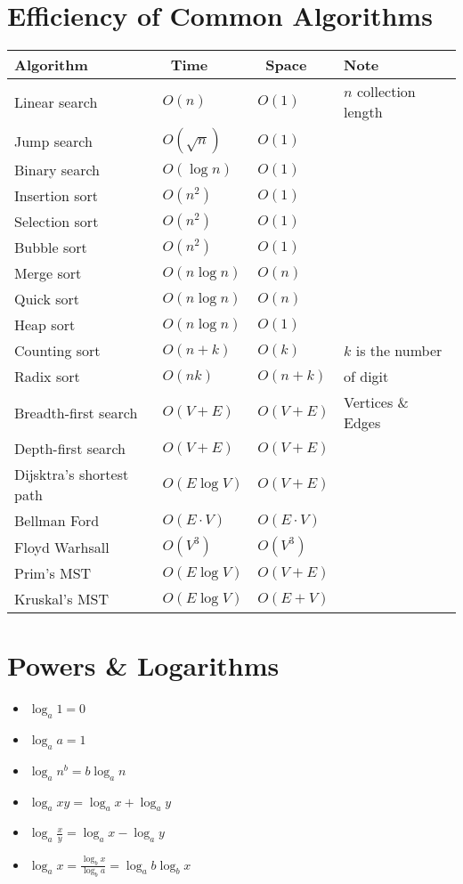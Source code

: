 \documentclass[11pt]{article}
\begin{document}
\section{Efficiency of Common Algorithms}
\label{sec:org502e29c}


\begin{center}
\begin{tabular}{llll}
Algorithm &  Time &  Space & Note\\
\hline
Linear search & \(O(n)\) & \(O(1)\) & \(n\) collection length\\
Jump search & \(O(\sqrt{n})\) & \(O(1)\) & \\
Binary search & \(O(\log n)\) & \(O(1)\) & \\
\hline
Insertion sort & \(O(n^2)\) & \(O(1)\) & \\
Selection sort & \(O(n^2)\) & \(O(1)\) & \\
Bubble sort & \(O(n^2)\) & \(O(1)\) & \\
Merge sort & \(O(n \log n)\) & \(O(n)\) & \\
Quick sort & \(O(n \log n)\) & \(O(n)\) & \\
Heap sort & \(O(n \log n)\) & \(O(1)\) & \\
\hline
Counting sort & \(O(n+k)\) & \(O(k)\) & \(k\) is the number\\
Radix sort & \(O(nk)\) & \(O(n+k)\) & of digit\\
\hline
Breadth-first search & \(O(V+E)\) & \(O(V+E)\) & Vertices \& Edges\\
Depth-first search & \(O(V+E)\) & \(O(V+E)\) & \\
Dijsktra's shortest path & \(O(E \log V)\) & \(O(V+E)\) & \\
Bellman Ford & \(O(E \cdot V)\) & \(O(E \cdot V)\) & \\
Floyd Warhsall & \(O(V^3)\) & \(O(V^3)\) & \\
Prim's MST & \(O(E \log V)\) & \(O(V+E)\) & \\
Kruskal's MST & \(O(E \log V)\) & \(O(E+V)\) & \\
\hline
\end{tabular}
\end{center}

\section{Powers \& Logarithms}
\label{sec:org99b4f5f}

\begin{itemize}
\item \(\log_a 1 = 0\)

\item \(\log_a a = 1\)

\item \(\log_a n^b = b \log_a n\)

\item \(\log_a xy = \log_a x + \log_a y\)

\item \(\log_a \frac{x}{y} = \log_a x - \log_a y\)

\item \(\log_a x = \frac{\log_b x}{\log_b a} = \log_a b \log_b x\)
\end{itemize}
\end{document}
